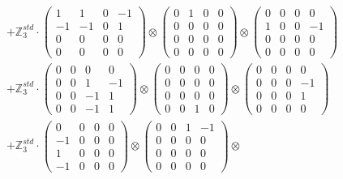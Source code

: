 \documentclass{article}
\begin{document}
{\begin{align}
        &+ \label{Rs16-Rc11-Solution-8-c22} \mathbb{Z}_3^{std} \cdot 
            \begin{pmatrix} 1 & 1 & 0 & -1 \\ -1 & -1 & 0 & 1 \\ 0 & 0 & 0 & 0 \\ 0 & 0 & 0 & 0 \end{pmatrix} \otimes 
            \begin{pmatrix} 0 & 1 & 0 & 0 \\ 0 & 0 & 0 & 0 \\ 0 & 0 & 0 & 0 \\ 0 & 0 & 0 & 0 \end{pmatrix} \otimes 
            \begin{pmatrix} 0 & 0 & 0 & 0 \\ 1 & 0 & 0 & -1 \\ 0 & 0 & 0 & 0 \\ 0 & 0 & 0 & 0 \end{pmatrix} \\ 
        &+ \label{Rs16-Rc11-Solution-8-c23} \mathbb{Z}_3^{std} \cdot 
            \begin{pmatrix} 0 & 0 & 0 & 0 \\ 0 & 0 & 1 & -1 \\ 0 & 0 & -1 & 1 \\ 0 & 0 & -1 & 1 \end{pmatrix} \otimes 
            \begin{pmatrix} 0 & 0 & 0 & 0 \\ 0 & 0 & 0 & 0 \\ 0 & 0 & 0 & 0 \\ 0 & 0 & 1 & 0 \end{pmatrix} \otimes 
            \begin{pmatrix} 0 & 0 & 0 & 0 \\ 0 & 0 & 0 & -1 \\ 0 & 0 & 0 & 1 \\ 0 & 0 & 0 & 0 \end{pmatrix} \\ 
        &+ \label{Rs16-Rc11-Solution-8-c24} \mathbb{Z}_3^{std} \cdot 
            \begin{pmatrix} 0 & 0 & 0 & 0 \\ -1 & 0 & 0 & 0 \\ 1 & 0 & 0 & 0 \\ -1 & 0 & 0 & 0 \end{pmatrix} \otimes 
            \begin{pmatrix} 0 & 0 & 1 & -1 \\ 0 & 0 & 0 & 0 \\ 0 & 0 & 0 & 0 \\ 0 & 0 & 0 & 0 \end{pmatrix} \otimes 

\end{align}}
\end{document}
